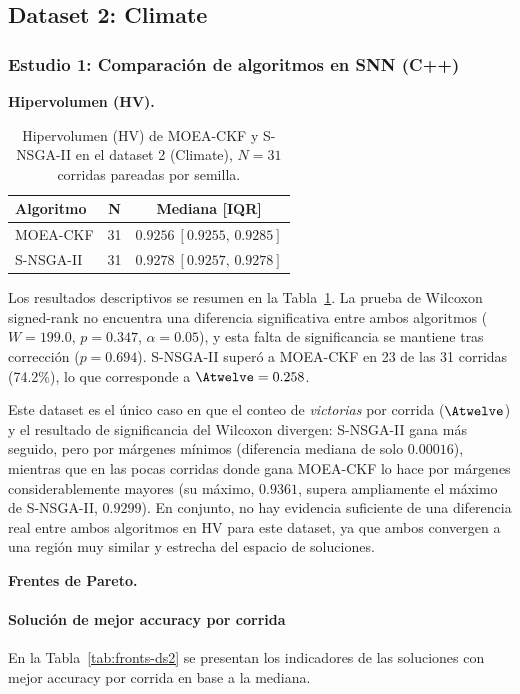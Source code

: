 \subsection{Dataset 2: Climate}
\label{sec:ds2}

\subsubsection{Estudio 1: Comparación de algoritmos en SNN (C++)}
\label{sec:ds2-estudio1}

\textbf{Hipervolumen (HV).}\label{sec:ds2-hv}

\begin{table}[htbp]
\centering
\small
\caption{Hipervolumen (HV) de MOEA-CKF y S-NSGA-II en el dataset 2 (Climate), $N=31$ corridas
pareadas por semilla.}
\label{tab:hv-ds2}
\begin{tabular}{@{}lcc@{}}
\toprule
\textbf{Algoritmo} & \textbf{N} & \textbf{Mediana [IQR]} \\
\midrule
MOEA-CKF & 31 & $0.9256\ [0.9255,\,0.9285]$ \\
S-NSGA-II & 31 & $0.9278\ [0.9257,\,0.9278]$ \\
\bottomrule
\end{tabular}
\end{table}

Los resultados descriptivos se resumen en la Tabla~\ref{tab:hv-ds2}. La prueba de Wilcoxon signed-rank no encuentra una diferencia significativa entre ambos algoritmos ($W=199.0$, $p=0.347$, $\alpha=0.05$), y esta falta de significancia se mantiene tras corrección ($p=0.694$). S-NSGA-II superó a MOEA-CKF en 23 de las 31 corridas (74.2\%), lo que corresponde a $\Atwelve=0.258$.

Este dataset es el único caso en que el conteo de \textit{victorias} por corrida ($\Atwelve$) y el resultado de significancia del Wilcoxon divergen: S-NSGA-II gana más seguido, pero por márgenes mínimos (diferencia mediana de solo $0.00016$), mientras que en las pocas corridas donde gana MOEA-CKF lo hace por márgenes considerablemente mayores (su máximo, $0.9361$, supera ampliamente el máximo de S-NSGA-II, $0.9299$). En conjunto, no hay evidencia suficiente de una diferencia real entre ambos algoritmos en HV para este dataset, ya que ambos convergen a una región muy similar y estrecha del espacio de soluciones.

\textbf{Frentes de Pareto.}\label{sec:ds2-fronts}

\paragraph{Solución de mejor accuracy por corrida} En la Tabla~\ref{tab:fronts-ds2} se presentan los indicadores de las soluciones con mejor accuracy por corrida en base a la mediana.

